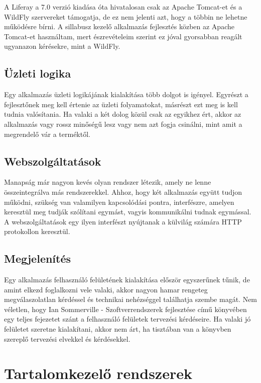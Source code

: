 \documentclass[hidelinks, 12pt, a4paper]{report}
\begin{document}
A Liferay a 7.0 verzió kiadása óta hivatalosan csak az Apache Tomcat-et és a WildFly szervereket támogatja, de ez nem jelenti azt, hogy a többin ne lehetne működésre bírni. A sillabusz kezelő alkalmazás fejlesztés közben az Apache Tomcat-et használtam, mert észrevételeim szerint ez jóval gyorsabban reagált ugyanazon kérésekre, mint a WildFly.

\subsection{Üzleti logika}

Egy alkalmazás üzleti logikájának kialakítása több dolgot is igényel. Egyrészt a fejlesztőnek meg kell értenie az üzleti folyamatokat, másrészt ezt meg is kell tudnia valósítania. Ha valaki a két dolog közül csak az egyikhez ért, akkor az alkalmazás vagy rossz minőségű lesz vagy nem azt fogja csinálni, mint amit a megrendelő vár a terméktől.

\subsection{Webszolgáltatások}

Manapság már nagyon kevés olyan rendszer létezik, amely ne lenne összeintegrálva más rendszerekkel. Ahhoz, hogy két alkalmazás együtt tudjon működni, szükség van valamilyen kapcsolódási pontra, interfészre, amelyen keresztül meg tudják szólítani egymást, vagyis kommunikálni tudnak egymással. A webszolgáltatások egy ilyen interfészt nyújtanak a külvilág számára HTTP protokollon keresztül.

\subsection{Megjelenítés}

Egy alkalmazás felhasználó felületének kialakítása először egyszerűnek tűnik, de amint elkezd foglalkozni vele valaki, akkor nagyon hamar rengeteg megválaszolatlan kérdéssel és technikai nehézséggel találhatja szembe magát. Nem véletlen, hogy Ian Sommerville - Szoftverrendszerek fejlesztése című \cite{szoftverrendszerek-fejlesztese} könyvében egy teljes fejezetet szánt a felhasználó felületek tervezési kérdéseire. Ha valaki jó felületet szeretne kialakítani, akkor nem árt, ha tisztában van a könyvben szereplő tervezési elvekkel és kérdésekkel.

\section{Tartalomkezelő rendszerek}
\end{document}

